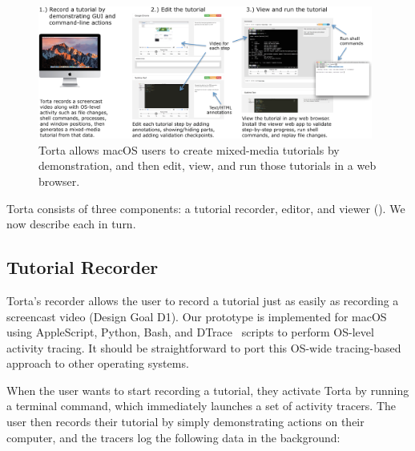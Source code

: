 \begin{figure}
\centering
\includegraphics[width=0.98\textwidth]{figures/torta/torta-overview.png}

\caption{Torta allows macOS users to create mixed-media tutorials
by demonstration, and then edit, view, and run those tutorials in a web
browser.}

\label{fig:torta-overview}
\end{figure}

Torta consists of three components: a tutorial recorder, editor, and
viewer (). We now describe each in turn.


\subsection{Tutorial Recorder}

Torta's recorder allows the user to record a tutorial just as easily as
recording a screencast video (Design Goal D1).
%
Our prototype is implemented for macOS using AppleScript, Python, Bash,
and DTrace~\cite{Cantrill2004} scripts to perform OS-level activity tracing. It
should be straightforward to port this OS-wide tracing-based approach to other
operating systems.


When the user wants to start recording a tutorial, they activate Torta
by running a terminal command, which immediately launches a set of
activity tracers. The user then records their tutorial by simply
demonstrating actions on their computer, and the tracers log the
following data in the background:

